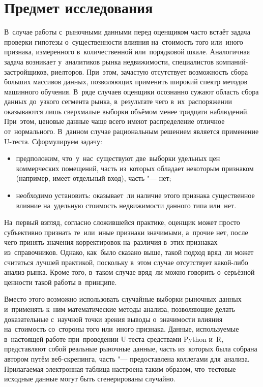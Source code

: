 \documentclass[]{scrartcl}
\begin{document}
\section{Предмет исследования}
В~случае работы с~рыночными данными перед оценщиком часто встаёт задача проверки гипотезы о~существенности влияния на~стоимость того или~иного признака, измеренного в~количественной или~порядковой шкале. Аналогичная задача возникает у~аналитиков рынка недвижимости, специалистов компаний-застройщиков, риелторов. При~этом, зачастую отсутствует возможность сбора больших массивов данных, позволяющих применить широкий спектр методов машинного обучения. В~ряде случаев оценщики осознанно сужают область сбора данных до~узкого сегмента рынка, в~результате чего в~их~распоряжении оказываются лишь сверхмалые выборки объёмом менее тридцати наблюдений. При~этом, ценовые данные чаще всего имеют распределение отличное от~нормального. В~данном случае рациональным решением является применение U-теста. Сформулируем задачу:
\begin{itemize}
	\item предположим, что~у~нас~существуют две~выборки удельных цен коммерческих помещений, часть из~которых обладает некоторым признаком (например, имеет отдельный вход), часть "--- нет;
	\item необходимо установить: оказывает~ли наличие этого признака существенное влияние на~удельную стоимость недвижимости данного типа или~нет.
\end{itemize}
На~первый взгляд, согласно сложившейся практике, оценщик может просто субъективно признать те~или~иные признаки значимыми, а~прочие нет, после чего принять значения корректировок на~различия в~этих признаках из~справочников. Однако, как~было сказано выше, такой подход вряд~ли может считаться лучшей практикой, поскольку в~этом случае отсутствует какой-либо анализ рынка. Кроме того, в~таком случае вряд~ли можно говорить о~серьёзной ценности такой работы в~принципе.

Вместо этого возможно использовать случайные выборки рыночных данных и~применять к~ним математические методы анализа, позволяющие делать доказательные с~научной точки зрения выводы о~значимости влияния на~стоимость со~стороны того или~иного признака. Данные, используемые в~настоящей работе при~проведении U-теста средствами Python и~R, представляют собой реальные рыночные данные, часть из~которых была собрана автором путём веб-скрепинга, часть "--- предоставлена коллегами для~анализа. Прилагаемая электронная таблица настроена таким образом, что~тестовые исходные данные могут быть сгенерированы случайно.
\end{document}
